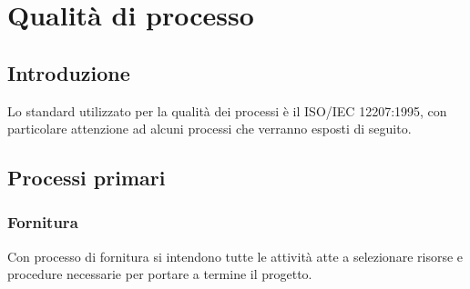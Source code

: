 \chapter{Qualità di processo}\label{qualita-di-processo}

\section{Introduzione}
Lo standard utilizzato per la qualità dei processi è il ISO/IEC 12207:1995, con particolare attenzione ad alcuni processi che verranno esposti di seguito.

\section{Processi primari}
\subsection{Fornitura}
Con processo di fornitura si intendono tutte le attività atte a selezionare risorse e procedure necessarie per portare a termine il progetto. 

